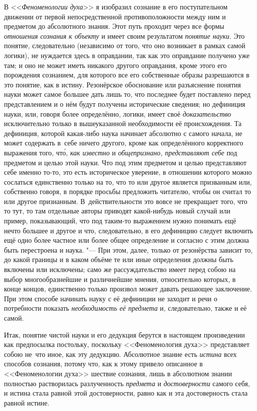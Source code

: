 В <<{\em Феноменологии духа}>> я изобразил сознание в его
поступательном движении от первой непосредственной противоположности между
ним и предметом до абсолютного знания. Этот путь проходит через все формы
{\em отношения сознания к объекту} и имеет своим
результатом {\em понятие науки}. Это понятие,
следовательно (независимо от того, что оно возникает в рамках самой
логики), не нуждается здесь в оправдании, так как это оправдание получено
уже там; и оно не может иметь никакого другого оправдания, кроме этого его
порождения сознанием, для которого все его собственные образы разрешаются в
это понятие, как в истину. Резонёрское обоснование или разъяснение
понятия науки может самое большее дать лишь то, что последнее будет
поставлено перед представлением и о нём будут получены исторические
сведения; но дефиниция науки, или, говоря более определённо, логики, имеет
своё {\em доказательство} исключительно только в
вышеуказанной необходимости её происхождения. Та дефиниция, которой
какая-либо наука начинает абсолютно с самого начала, не может содержать в~себе
ничего другого, кроме как определённого корректного выражения того,
чт\'{о}, {\em как известно} и {\em общепризнано, представляют себе}
под предметом и целью этой
науки. Что под этим предметом и целью представляют себе именно то-то, это
есть историческое уверение, в отношении которого можно сослаться
единственно только на то, что то или другое является призванным или,
собственно говоря, в порядке просьбы предложить читателю, чтобы он считал
то или другое признанным. В~действительности это вовсе не прекращает того,
что то тут, то там отдельные авторы приводят какой-нибудь новый случай или
пример, показывающий, что под таким-то выражением нужно понимать ещё нечто
большее и другое и что, следовательно, в его дефиницию следует включить ещё
одно более частное или более общее определение и согласно с этим должна
быть перестроена и наука. "--- При этом, далее, только от резонёрства
зависит то, до какой границы и в каком объёме те или иные определения
должны быть включены или исключены; само же рассуждательство имеет перед
собою на выбор многообразнейшие и различнейшие мнения, относительно
которых, в конце концов, единственно только произвол может давать решающее
заключение. При этом способе начинать науку с её дефиниции не заходит и
речи о потребности показать {\em необходимость её
предмета} и, следовательно, также и её самой.

Итак, понятие чистой науки и его дедукция берутся в настоящем произведении
как предпосылка постольку, поскольку <<Феноменология духа>> представляет
собою не~что иное, как эту дедукцию. Абсолютное знание есть
{\em истина} всех способов сознания, потому что, как к
этому привело описанное в <<Феноменологии духа>> шествие сознания, лишь в
абсолютном знании полностью растворилась разлученность
{\em предмета} и {\em достоверности} самого себя, и истина стала равной
этой достоверности, равно как и эта достоверность стала равной истине.

